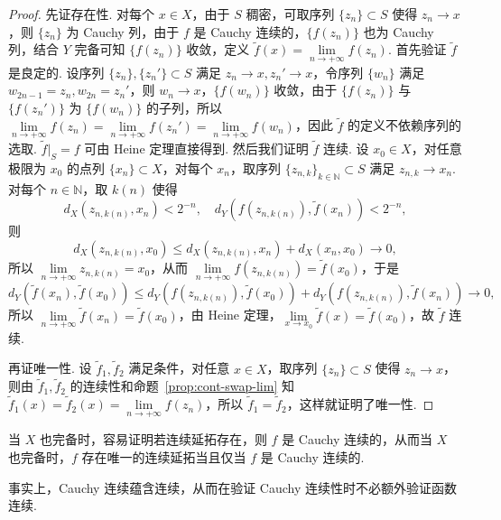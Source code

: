 \documentclass[../main.tex]{subfiles}
\begin{document}
\begin{proof}
    先证存在性. 对每个 $x \in X$，由于 $S$ 稠密，可取序列 $\{z_n\} \subset S$ 使得 $z_n \to x$，则 $\{z_n\}$ 为 Cauchy 列，由于 $f$ 是 Cauchy 连续的，$\{f(z_n)\}$ 也为 Cauchy 列，结合 $Y$ 完备可知 $\{f(z_n)\}$ 收敛，定义 $\tilde{f}(x) = \lim\limits_{n \to +\infty} f(z_n)$. 首先验证 $\tilde{f}$ 是良定的. 设序列 $\{z_n\}, \{z_n'\} \subset S$ 满足 $z_n \to x, z_n' \to x$，令序列 $\{w_n\}$ 满足 $w_{2n - 1} = z_n, w_{2n} = z_n'$，则 $w_n \to x$，$\{f(w_n)\}$ 收敛，由于 $\{f(z_n)\}$ 与 $\{f(z_n')\}$ 为 $\{f(w_n)\}$ 的子列，所以 $\lim\limits_{n \to +\infty} f(z_n) = \lim\limits_{n \to +\infty} f(z_n') = \lim\limits_{n \to +\infty} f(w_n)$，因此 $\tilde{f}$ 的定义不依赖序列的选取. $\tilde{f}|_S = f$ 可由 Heine 定理直接得到. 然后我们证明 $\tilde{f}$ 连续. 设 $x_0 \in X$，对任意极限为 $x_0$ 的点列 $\{x_n\} \subset X$，对每个 $x_n$，取序列 $\{z_{n, k}\}_{k \in \mathbb N} \subset S$ 满足 $z_{n, k} \to x_n$. 对每个 $n \in \mathbb N$，取 $k(n)$ 使得
    $$
    d_X(z_{n, k(n)}, x_n) < 2^{-n},\quad d_Y(f(z_{n, k(n)}), \tilde{f}(x_n)) < 2^{-n}, 
    $$
    则 
    $$
    d_X(z_{n, k(n)}, x_0) \leqslant d_X(z_{n, k(n)}, x_n) + d_X(x_n, x_0) \to 0, 
    $$
    所以 $\lim\limits_{n \to +\infty} z_{n, k(n)} = x_0$，从而 $\lim\limits_{n \to +\infty} f(z_{n, k(n)}) = \tilde{f}(x_0)$，于是
    $$
    d_Y(\tilde{f}(x_n), \tilde{f}(x_0)) \leqslant d_Y(f(z_{n, k(n)}), \tilde{f}(x_0)) + d_Y(f(z_{n, k(n)}), \tilde{f}(x_n)) \to 0, 
    $$
    所以 $\lim\limits_{n \to +\infty} \tilde{f}(x_n) = \tilde{f}(x_0)$，由 Heine 定理，$\lim\limits_{x \to x_0} \tilde{f}(x) = \tilde{f}(x_0)$，故 $\tilde{f}$ 连续. 

    再证唯一性. 设 $\tilde{f}_1, \tilde{f}_2$ 满足条件，对任意 $x \in X$，取序列 $\{z_n\} \subset S$ 使得 $z_n \to x$，则由 $\tilde{f}_1, \tilde{f}_2$ 的连续性和命题~\ref{prop:cont-swap-lim} 知 $\tilde{f}_1(x) = \tilde{f}_2(x) = \lim\limits_{n \to +\infty} f(z_n)$，所以 $\tilde{f}_1 = \tilde{f}_2$，这样就证明了唯一性. 
\end{proof}

\begin{remark}
    当 $X$ 也完备时，容易证明若连续延拓存在，则 $f$ 是 Cauchy 连续的，从而当 $X$ 也完备时，$f$ 存在唯一的连续延拓当且仅当 $f$ 是 Cauchy 连续的. 

    事实上，Cauchy 连续蕴含连续，从而在验证 Cauchy 连续性时不必额外验证函数连续. 
\end{remark}

\end{document}
